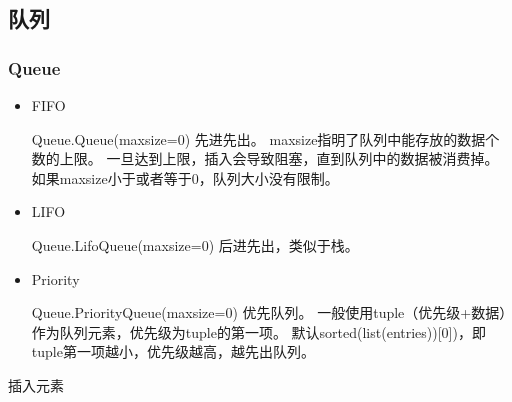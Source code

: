 \documentclass[letterpaper,10pt,english]{sphinxmanual}
\begin{document}
\subsection{队列}
\label{\detokenize{python/11_dataStruct:id3}}

\subsubsection{Queue}
\label{\detokenize{python/11_dataStruct:queue}}
%
\begin{sphinxVerbatim}[commandchars=\\\{\}]
 
\end{sphinxVerbatim}
\begin{itemize}
\item {} 
FIFO

%
\begin{sphinxVerbatim}[commandchars=\\\{\}]
Queue.Queue(maxsize=0)
先进先出。
maxsize指明了队列中能存放的数据个数的上限。
一旦达到上限，插入会导致阻塞，直到队列中的数据被消费掉。
如果maxsize小于或者等于0，队列大小没有限制。
\end{sphinxVerbatim}

\item {} 
LIFO

%
\begin{sphinxVerbatim}[commandchars=\\\{\}]
Queue.LifoQueue(maxsize=0)
后进先出，类似于栈。
\end{sphinxVerbatim}

\item {} 
Priority

%
\begin{sphinxVerbatim}[commandchars=\\\{\}]
Queue.PriorityQueue(maxsize=0)
优先队列。
一般使用tuple（优先级+数据）作为队列元素，优先级为tuple的第一项。
默认sorted(list(entries))[0])，即tuple第一项越小，优先级越高，越先出队列。
\end{sphinxVerbatim}

\end{itemize}

插入元素

%
\begin{sphinxVerbatim}[commandchars=\\\{\}]
\end{sphinxVerbatim}
\end{document}
